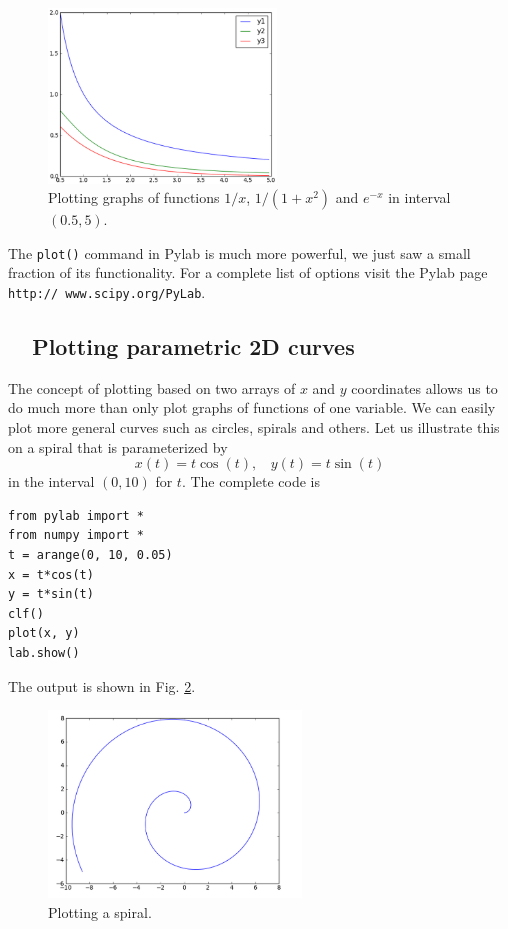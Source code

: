 \begin{figure}[!ht]
\begin{center}
\includegraphics[width=0.54\textwidth]{imgp/plot7.png}
\end{center}
\vspace{-4mm}
\caption{Plotting graphs of functions $1/x$, $1 / (1 + x^2)$ and $e^{-x}$ in interval $(0.5, 5)$.}
\label{fig:plot7}
\vspace{-2mm}
\end{figure}
\noindent
The {\tt plot()} command in Pylab is much more powerful, we just saw a small 
fraction of its functionality. For a complete list of options 
visit the Pylab page {\tt http:// www.scipy.org/PyLab}.

\subsection{\ \ Plotting parametric 2D curves}\label{subsec:planarcurves}

The concept of plotting based on two arrays of $x$ and $y$ coordinates
allows us to do much more than only plot graphs of functions of one variable.
We can easily plot more general curves such as circles, spirals and others.
Let us illustrate this on a spiral that is parameterized 
by 
$$
x(t) = t \cos(t), \ \ \ \ 
y(t) = t \sin(t)
$$ 
in the interval $(0, 10)$ for $t$. The complete code is

\begin{verbatim}
from pylab import *
from numpy import *
t = arange(0, 10, 0.05)
x = t*cos(t)
y = t*sin(t)
clf()
plot(x, y)
lab.show()
\end{verbatim}
The output is shown in Fig. \ref{fig:plot6}.

\begin{figure}[!ht]
\begin{center}
\includegraphics[width=0.6\textwidth]{imgp/plot6.png}
\end{center}
\vspace{-6mm}
\caption{Plotting a spiral.}
\label{fig:plot6}
\vspace{-0mm}
\end{figure}
\noindent

